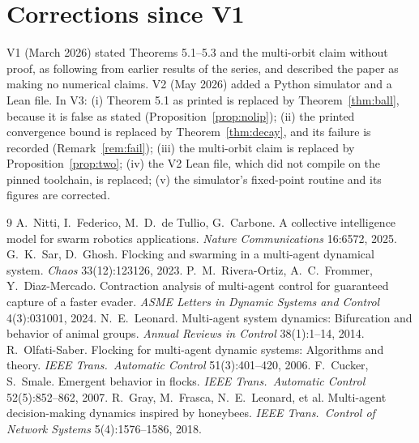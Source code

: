 \documentclass[11pt]{article}
\theoremstyle{definition}
\theoremstyle{remark}
\begin{document}
\section{Corrections since V1}
V1 (March 2026) stated Theorems 5.1--5.3 and the multi-orbit claim without proof, as following from earlier
results of the series, and described the paper as making no numerical claims. V2 (May 2026) added a Python
simulator and a Lean file. In V3: (i) Theorem 5.1 as printed is replaced by Theorem~\ref{thm:ball}, because it is
false as stated (Proposition~\ref{prop:nolip}); (ii) the printed convergence bound is replaced by
Theorem~\ref{thm:decay}, and its failure is recorded (Remark~\ref{rem:fail}); (iii) the multi-orbit claim is
replaced by Proposition~\ref{prop:two}; (iv) the V2 Lean file, which did not compile on the pinned toolchain, is
replaced; (v) the simulator's fixed-point routine and its figures are corrected.

\begin{thebibliography}{9}
 A.~Nitti, I.~Federico, M.~D.~de Tullio, G.~Carbone. A collective intelligence model for swarm robotics applications. \emph{Nature Communications} 16:6572, 2025.
 G.~K.~Sar, D.~Ghosh. Flocking and swarming in a multi-agent dynamical system. \emph{Chaos} 33(12):123126, 2023.
 P.~M.~Rivera-Ortiz, A.~C.~Frommer, Y.~Diaz-Mercado. Contraction analysis of multi-agent control for guaranteed capture of a faster evader. \emph{ASME Letters in Dynamic Systems and Control} 4(3):031001, 2024.
 N.~E.~Leonard. Multi-agent system dynamics: Bifurcation and behavior of animal groups. \emph{Annual Reviews in Control} 38(1):1--14, 2014.
 R.~Olfati-Saber. Flocking for multi-agent dynamic systems: Algorithms and theory. \emph{IEEE Trans.\ Automatic Control} 51(3):401--420, 2006.
 F.~Cucker, S.~Smale. Emergent behavior in flocks. \emph{IEEE Trans.\ Automatic Control} 52(5):852--862, 2007.
 R.~Gray, M.~Frasca, N.~E.~Leonard, et al. Multi-agent decision-making dynamics inspired by honeybees. \emph{IEEE Trans.\ Control of Network Systems} 5(4):1576--1586, 2018.
\end{thebibliography}
\end{document}
